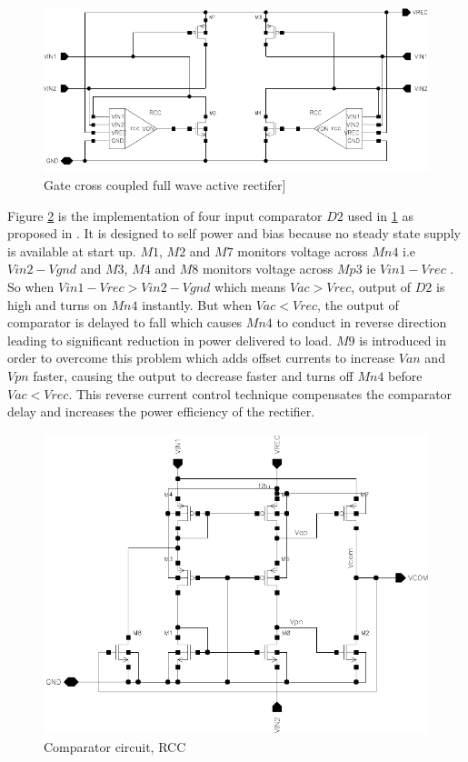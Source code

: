 \documentclass[12pt,a4paper,UKenglish]{article}
\begin{document}
\begin{figure}[htbp] %
   \centering
   \includegraphics[width=\textwidth]{img/rectifier_schematic.pdf} 
   \caption{Gate cross coupled full wave active rectifer]}
   \label{rect_rcc}
\end{figure}

Figure \ref{rcc}  is the implementation of four input comparator $D2$ used in \ref{rect_rcc} as proposed in \cite{rectrcc}. It is designed to self power and bias because no steady state supply is available at start up. $M1$, $M2$ and $M7$ monitors voltage across $Mn4$ i.e $Vin2 - Vgnd$ and $M3$, $M4$ and $M8$ monitors voltage across $Mp3$ ie $Vin1 - Vrec$ . So when $Vin1 - Vrec > Vin2 - Vgnd$ which means $Vac > Vrec$, output of $D2$ is high and turns on $Mn4$ instantly. But when $Vac < Vrec$, the output of comparator is delayed to fall which causes $Mn4$ to conduct in reverse direction leading to significant reduction in power delivered to load. $M9$ is introduced in order to overcome this problem which adds offset currents to increase $Van$ and $Vpn$ faster, causing the output to decrease faster and turns off $Mn4$ before $Vac < Vrec$. This reverse current control technique compensates the comparator delay and increases the power efficiency of the rectifier. \\

\begin{figure}[htbp] %
   \centering
   \includegraphics[width=\textwidth]{img/rectifier_rcc5.pdf} 
   \caption{Comparator circuit, RCC }
   \label{rcc}
\end{figure}
\end{document}
